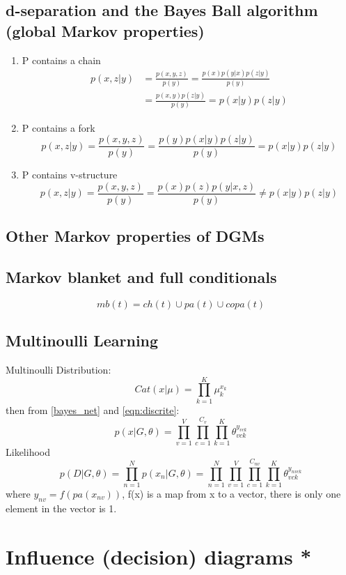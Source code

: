 \subsection{d-separation and the Bayes Ball algorithm (global Markov properties)}
\begin{enumerate}
\item P contains a chain
\begin{equation}\begin{split}
p(x,z|y) & = \frac{p(x,y,z)}{p(y)}
= \frac{p(x)p(y|x)p(z|y)}{p(y)} \\
 & = \frac{p(x,y)p(z|y)}{p(y)} = p(x|y)p(z|y)
\end{split}\end{equation}

\item P contains a fork
\begin{equation}
p(x,z|y) = \frac{p(x,y,z)}{p(y)}
= \frac{p(y)p(x|y)p(z|y)}{p(y)}
= p(x|y)p(z|y)
\end{equation}
\item P contains v-structure
\begin{equation}
p(x,z|y) = \frac{p(x,y,z)}{p(y)}
= \frac{p(x)p(z)p(y|x,z)}{p(y)}
\neq p(x|y)p(z|y)
\end{equation}
\end{enumerate}



\subsection{Other Markov properties of DGMs}


\subsection{Markov blanket and full conditionals}

\begin{equation}
mb(t) = ch(t)\cup pa(t)\cup copa(t)
\end{equation}


\subsection{Multinoulli Learning}
Multinoulli Distribution:
\begin{equation}\label{eqn:discrite}
Cat(x|\mu) = \prod_{k=1}^K\mu_k^{x_k}
\end{equation}
then from \ref{bayes_net} and \ref{eqn:discrite}:
\begin{equation}
p(x|G,\theta) = \prod_{v=1}^V\prod_{c=1}^{C_v}\prod_{k=1}^K
\theta_{vck}^{y_{vck}}
\end{equation}
Likelihood
\begin{equation}
p(D|G,\theta) = \prod_{n=1}^N p(x_n|G,\theta)
=\prod_{n=1}^N\prod_{v=1}^V\prod_{c=1}^{C_{nv}}\prod_{k=1}^K
\theta_{vck}^{y_{nvck}}
\end{equation}
where $y_{nv} = f(pa(x_{nv}))$, f(x) is a map from x to a vector, there is only one element in the vector is 1.


\section{Influence (decision) diagrams *}

